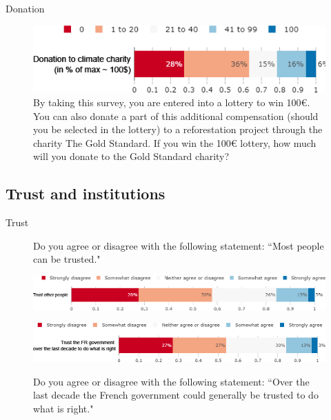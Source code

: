 \begin{framefont}{\small}
\begin{frame}{Donation}
 \begin{figure}[h!]
 \centering
 \caption{By taking this survey, you are entered into a lottery to win 100\euro{}. You can also donate a part of this additional compensation (should you be selected in the lottery) to a reforestation project through the charity The Gold Standard. If you win the 100\euro{} lottery, how much will you donate to the Gold Standard charity?}
 \includegraphics[width=.78\paperwidth]{../figures/FR/donation_agg_FR.png}
 \end{figure}
 \end{frame}


\subsection{Trust and institutions}

\begin{frame}{Trust}%
\vspace{-.5cm}
\begin{figure}[h!]
\caption{Do you agree or disagree with the following statement: ``Most people can be trusted."}
\includegraphics[width=.7\paperwidth]{../figures/FR/can_trust_people_FR.png} \\
\vspace{.1cm}
\caption{Do you agree or disagree with the following statement: ``Over the last decade the French government could generally be trusted to do what is right."}
\includegraphics[width=.7\paperwidth]{../figures/FR/can_trust_govt_FR.png}\\
\end{figure}
\end{frame}


\end{framefont}
